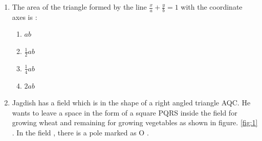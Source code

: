 %
\begin{enumerate}
        \item The area of the triangle formed by the line $ \frac{x}{a} + \frac{y}{b} = 1 $ with the coordinate axes is :
        \begin{enumerate}
             \item  $ ab $
             \item  $\frac{1}{2}ab$
             \item  $\frac{1}{4}ab$
             \item  $2ab$
        \end{enumerate}
	\item Jagdish has a field which is in the shape of a right angled triangle AQC. He wants to leave a space in the form of a square PQRS inside the field for growing wheat and remaining for growing vegetables as shown in figure. \ref{fig:1} . In the field , there is a pole marked as O .


\end{enumerate}

